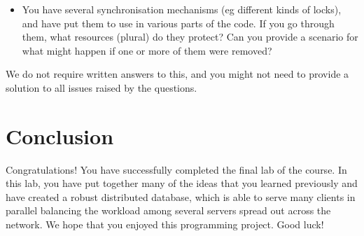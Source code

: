 \documentclass[a4paper]{article}
\begin{document}
\begin{itemize}  
\item You have several synchronisation mechanisms (eg different kinds
  of locks), and have put them to use in various parts of the code. If
  you go through them, what resources (plural) do they protect? Can
  you provide a scenario for what might happen if one or more of them
  were removed?
\end{itemize}

We do not require written answers to this, and you might not need to
provide a solution to all issues raised by the questions.


\section{Conclusion}
Congratulations! You have successfully completed the final lab of the course. In
this lab, you have put together many of the ideas that you learned previously
and have created a robust distributed database, which is able to serve many
clients in parallel balancing the workload among several servers spread out
across the network. We hope that you enjoyed this programming project. Good
luck!

\printbibliography
\end{document}
